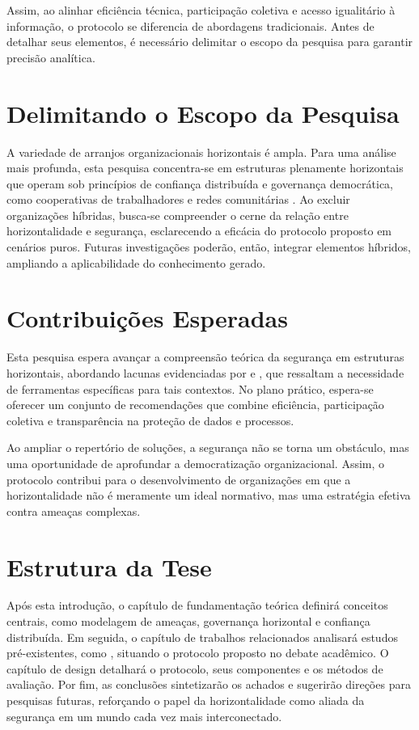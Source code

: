 Assim, ao alinhar eficiência técnica, participação coletiva
e acesso igualitário à informação, o protocolo se diferencia
de abordagens tradicionais. Antes de detalhar seus
elementos, é necessário delimitar o escopo da pesquisa para
garantir precisão analítica.

\section{Delimitando o Escopo da Pesquisa}
\label{sec:delimitacao_escopo}

A variedade de arranjos organizacionais horizontais é ampla.
Para uma análise mais profunda, esta pesquisa concentra-se
em estruturas plenamente horizontais que operam sob
princípios de confiança distribuída e governança
democrática, como cooperativas de trabalhadores e redes
comunitárias \cite{WorkerCooperativesinAmerica,
EverydayRevolutions}. Ao excluir organizações híbridas,
busca-se compreender o cerne da relação entre
horizontalidade e segurança, esclarecendo a eficácia do
protocolo proposto em cenários puros. Futuras investigações
poderão, então, integrar elementos híbridos, ampliando a
aplicabilidade do conhecimento gerado.

\section{Contribuições Esperadas}
\label{sec:contribuicoes_esperadas}

Esta pesquisa espera avançar a compreensão teórica da
segurança em estruturas horizontais, abordando lacunas
evidenciadas por
\cite{ThreatModelingAsABasisForSecurityRequirements} e
\cite{DemystifyingTheThreatModelingProcess}, que ressaltam a
necessidade de ferramentas específicas para tais contextos.
No plano prático, espera-se oferecer um conjunto de
recomendações que combine eficiência, participação coletiva
e transparência na proteção de dados e processos.

Ao ampliar o repertório de soluções, a segurança não se
torna um obstáculo, mas uma oportunidade de aprofundar a
democratização organizacional. Assim, o protocolo contribui
para o desenvolvimento de organizações em que a
horizontalidade não é meramente um ideal normativo, mas uma
estratégia efetiva contra ameaças complexas.

\section{Estrutura da Tese} \label{sec:estrutura_tese}

Após esta introdução, o capítulo de fundamentação teórica
definirá conceitos centrais, como modelagem de ameaças,
governança horizontal e confiança distribuída. Em seguida, o
capítulo de trabalhos relacionados analisará estudos
pré-existentes, como \cite{Colbac, AbcCrypto}, situando o
protocolo proposto no debate acadêmico. O capítulo de design
detalhará o protocolo, seus componentes e os métodos de
avaliação. Por fim, as conclusões sintetizarão os achados e
sugerirão direções para pesquisas futuras, reforçando o
papel da horizontalidade como aliada da segurança em um
mundo cada vez mais interconectado.

